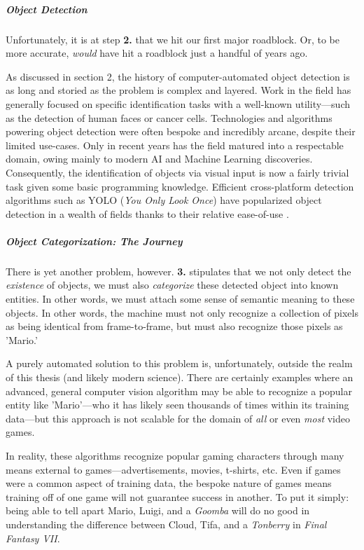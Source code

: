\documentclass{report}
\begin{document}
\subparagraph{Object Detection}
Unfortunately, it is at step \textbf{2.} that we hit our first major roadblock. Or, to be more accurate, \emph{would} have hit a roadblock just a handful of years ago. 

As discussed in section 2, the history of computer-automated object detection is as long and storied as the problem is complex and layered. Work in the field has generally focused on specific identification tasks with a well-known utility---such as the detection of human faces or cancer cells. Technologies and algorithms powering object detection were often bespoke and incredibly arcane, despite their limited use-cases. Only in recent years has the field matured into a respectable domain, owing mainly to modern AI and Machine Learning discoveries. Consequently, the identification of objects via visual input is now a fairly trivial task given some basic programming knowledge. Efficient cross-platform detection algorithms such as YOLO (\emph{You Only Look Once}) have popularized object detection in a wealth of fields thanks to their relative ease-of-use \cite{wang2022yolov7trainablebagoffreebiessets}. 

\subparagraph{Object Categorization: \emph{The Journey}}
There is yet another problem, however. \textbf{3.} stipulates that we not only detect the \emph{existence} of objects, we must also \emph{categorize} these detected object into known entities. In other words, we must attach some sense of semantic meaning to these objects. In other words, the machine must not only recognize a collection of pixels as being identical from frame-to-frame, but must also recognize those pixels as 'Mario.' 

A purely automated solution to this problem is, unfortunately, outside the realm of this thesis (and likely modern science). There are certainly examples where an advanced, general computer vision algorithm may be able to recognize a popular entity like 'Mario'---who it has likely seen thousands of times within its training data---but this approach is not scalable for the domain of \emph{all} or even \emph{most} video games. 

In reality, these algorithms recognize popular gaming characters through many means external to games---advertisements, movies, t-shirts, etc. Even if games were a common aspect of training data, the bespoke nature of games means training off of one game will not guarantee success in another. To put it simply: being able to tell apart Mario, Luigi, and a \emph{Goomba} will do no good in understanding the difference between Cloud, Tifa, and a \emph{Tonberry} in \emph{Final Fantasy VII}.
\end{document}
